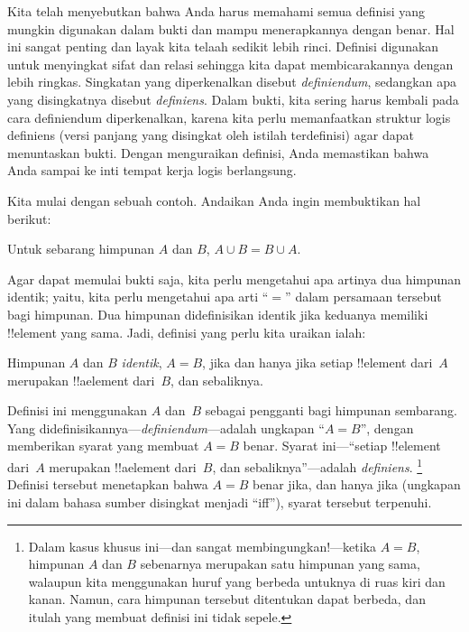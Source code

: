 \documentclass[../../../include/open-logic-section]{subfiles}
\begin{document}


Kita telah menyebutkan bahwa Anda harus memahami semua definisi yang
mungkin digunakan dalam bukti dan mampu menerapkannya dengan benar.
Hal ini sangat penting dan layak kita telaah sedikit lebih rinci.
Definisi digunakan untuk menyingkat sifat dan relasi sehingga kita
dapat membicarakannya dengan lebih ringkas. Singkatan yang
diperkenalkan disebut \emph{definiendum}, sedangkan apa yang
disingkatnya disebut \emph{definiens}. Dalam bukti, kita sering harus
kembali pada cara definiendum diperkenalkan, karena kita perlu
memanfaatkan struktur logis definiens (versi panjang yang disingkat
oleh istilah terdefinisi) agar dapat menuntaskan bukti. Dengan
menguraikan definisi, Anda memastikan bahwa Anda sampai ke inti tempat
kerja logis berlangsung.

Kita mulai dengan sebuah contoh. Andaikan Anda ingin membuktikan hal
berikut:

\begin{prop}
Untuk sebarang himpunan $A$ dan $B$, $A \cup B = B \cup A$.
\end{prop}

Agar dapat memulai bukti saja, kita perlu mengetahui apa artinya dua
himpunan identik; yaitu, kita perlu mengetahui apa arti ``$=$'' dalam
persamaan tersebut bagi himpunan. Dua himpunan didefinisikan identik
jika keduanya memiliki !!{element} yang sama. Jadi, definisi yang perlu
kita uraikan ialah:

\begin{defn}
Himpunan $A$ dan $B$ \emph{identik}, $A = B$, jika dan hanya jika setiap
!!{element} dari~$A$ merupakan !!a{element} dari~$B$, dan sebaliknya.
\end{defn}

Definisi ini menggunakan $A$ dan~$B$ sebagai pengganti bagi himpunan
sembarang. Yang didefinisikannya---\emph{definiendum}---adalah ungkapan
``$A = B$'', dengan memberikan syarat yang membuat $A = B$ benar.
Syarat ini---``setiap !!{element} dari~$A$ merupakan !!a{element}
dari~$B$, dan sebaliknya''---adalah \emph{definiens}.
\footnote{Dalam kasus khusus ini---dan sangat membingungkan!---ketika
  $A = B$, himpunan $A$ dan $B$ sebenarnya merupakan satu himpunan
  yang sama, walaupun kita menggunakan huruf yang berbeda untuknya di
  ruas kiri dan kanan. Namun, cara himpunan tersebut ditentukan dapat
  berbeda, dan itulah yang membuat definisi ini tidak sepele.}
Definisi tersebut menetapkan bahwa $A = B$ benar jika, dan hanya jika
(ungkapan ini dalam bahasa sumber disingkat menjadi ``iff''), syarat
tersebut terpenuhi.
\end{document}
